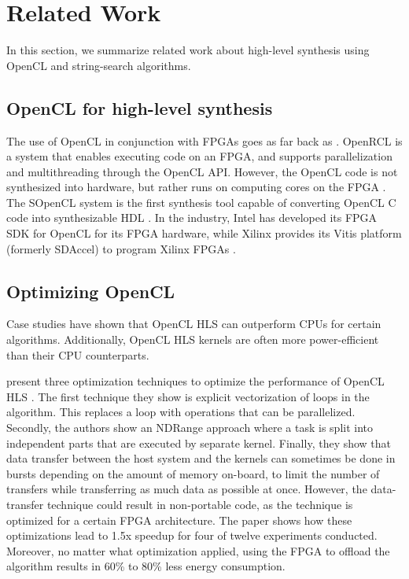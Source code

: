 \section{Related Work} \label{section:related_work}

In this section, we summarize related work about high-level synthesis using OpenCL and string-search algorithms.

\subsection{OpenCL for high-level synthesis}

The use of OpenCL in conjunction with FPGAs goes as far back as \citeyear{lin_openrcl_2010}.
OpenRCL is a system that enables executing code on an FPGA, and supports parallelization and multithreading through the OpenCL API.
However, the OpenCL code is not synthesized into hardware, but rather runs on computing cores on the FPGA \cite{lin_openrcl_2010}.
The SOpenCL system is the first synthesis tool capable of converting OpenCL C code into synthesizable HDL \cite{owaida_synthesis_2011}.
In the industry, Intel has developed its FPGA SDK for OpenCL for its FPGA hardware, while Xilinx provides its Vitis platform (formerly SDAccel) to program Xilinx FPGAs \cite{noauthor_intel_nodate-1, noauthor_vitis_nodate}.

\subsection{Optimizing OpenCL}

Case studies have shown that OpenCL HLS can outperform CPUs for certain algorithms.
Additionally, OpenCL HLS kernels are often more power-efficient than their CPU counterparts.

\citeauthor{zohouri_evaluating_2016} present three optimization techniques to optimize the performance of OpenCL HLS \cite{zohouri_evaluating_2016}.
The first technique they show is explicit vectorization of loops in the algorithm.
This replaces a loop with operations that can be parallelized.
Secondly, the authors show an NDRange approach where a task is split into independent parts that are executed by separate kernel.
Finally, they show that data transfer between the host system and the kernels can sometimes be done in bursts depending on the amount of memory on-board, to limit the number of transfers while transferring as much data as possible at once.
However, the data-transfer technique could result in non-portable code, as the technique is optimized for a certain FPGA architecture.
The paper shows how these optimizations lead to 1.5x speedup for four of twelve experiments conducted.
Moreover, no matter what optimization applied, using the FPGA to offload the algorithm results in 60\% to 80\% less energy consumption.

